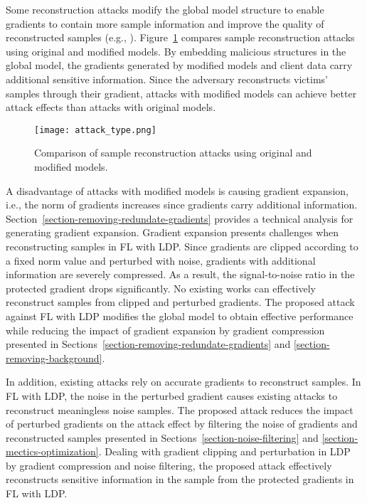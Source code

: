 Some reconstruction attacks modify the global model structure to enable gradients to contain more sample information and improve the quality of reconstructed samples (e.g., \cite{fowl2022robbing, Boenisch2021When, Song2020Analyzing, Khosravy2022Model, ganev2023inadequacy}). Figure~\ref{fig:attack_type} compares sample reconstruction attacks using original and modified models. By embedding malicious structures in the global model, the gradients generated by modified models and client data carry additional sensitive information. Since the adversary reconstructs victims' samples through their gradient, attacks with modified models can achieve better attack effects than attacks with original models.

\begin{figure}
\centering
\texttt{[image: attack\_type.png]}
\caption{Comparison of sample reconstruction attacks using original and modified models.}
\label{fig:attack_type}
\end{figure}

A disadvantage of attacks with modified models is causing gradient expansion, i.e., the norm of gradients increases since gradients carry additional information. Section~\ref{section-removing-redundate-gradients} provides a technical analysis for generating gradient expansion. Gradient expansion presents challenges when reconstructing samples in FL with LDP. Since gradients are clipped according to a fixed norm value and perturbed with noise, gradients with additional information are severely compressed. As a result, the signal-to-noise ratio in the protected gradient drops significantly. No existing works can effectively reconstruct samples from clipped and perturbed gradients. The proposed attack against FL with LDP modifies the global model to obtain effective performance while reducing the impact of gradient expansion by gradient compression presented in Sections~\ref{section-removing-redundate-gradients} and \ref{section-removing-background}.

In addition, existing attacks rely on accurate gradients to reconstruct samples. In FL with LDP, the noise in the perturbed gradient causes existing attacks to reconstruct meaningless noise samples. The proposed attack reduces the impact of perturbed gradients on the attack effect by filtering the noise of gradients and reconstructed samples presented in Sections~\ref{section-noise-filtering} and \ref{section-mectics-optimization}. Dealing with gradient clipping and perturbation in LDP by gradient compression and noise filtering, the proposed attack effectively reconstructs sensitive information in the sample from the protected gradients in FL with LDP.